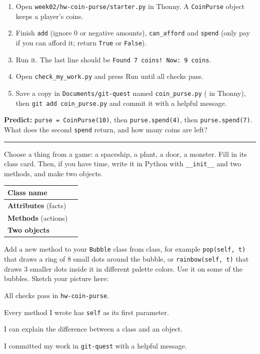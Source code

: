 \namedateline

\begin{core}
\begin{enumerate}[itemsep=2pt]
  \item Open \texttt{week02/hw-coin-purse/starter.py} in Thonny. A \texttt{CoinPurse} object keeps a player's coins.
  \item Finish \texttt{add} (ignore 0 or negative amounts), \texttt{can\_afford} and \texttt{spend} (only pay if you can afford it; return \texttt{True} or \texttt{False}).
  \item Run it. The last line should be \texttt{Found 7 coins! Now: 9 coins}.
  \item Open \texttt{check\_my\_work.py} and press Run until all checks pass.
  \item Save a copy in \texttt{Documents/git-quest} named \texttt{coin\_purse.py} ( in Thonny), then \texttt{git add coin\_purse.py} and commit it with a helpful message.
\end{enumerate}
\textbf{Predict:} \texttt{purse = CoinPurse(10)}, then \texttt{purse.spend(4)}, then \texttt{purse.spend(7)}. What does the second \texttt{spend} return, and how many coins are left? \rule{5cm}{0.4pt}
\end{core}

\begin{challenge}
Choose a thing from a game: a spaceship, a plant, a door, a monster. Fill in its class card. Then, if you have time, write it in Python with \texttt{\_\_init\_\_} and two methods, and make two objects.
\begin{center}
\renewcommand{\arraystretch}{1.7}
\begin{tabular}{|p{4cm}|p{9.5cm}|}
\hline
\textbf{Class name} & \\ \hline
\textbf{Attributes} (facts) & \\ \hline
\textbf{Methods} (actions) & \\ \hline
\textbf{Two objects} & \\ \hline
\end{tabular}
\end{center}
\end{challenge}

\begin{creative}
Add a new method to your \texttt{Bubble} class from class, for example \texttt{pop(self, t)} that draws a ring of 8 small dots around the bubble, or \texttt{rainbow(self, t)} that draws 3 smaller dots inside it in different palette colors. Use it on some of the bubbles. Sketch your picture here:
\answerspace{3cm}
\end{creative}

\begin{selfcheck}
  \item All checks pass in \texttt{hw-coin-purse}.
  \item Every method I wrote has \texttt{self} as its first parameter.
  \item I can explain the difference between a class and an object.
  \item I committed my work in \texttt{git-quest} with a helpful message.
\end{selfcheck}

